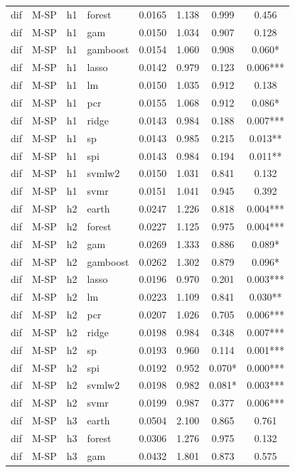 \begin{ThreePartTable}
\begin{longtable}[t]{llclcccc}
dif & M-SP & h1 & forest & 0.0165 & 1.138 & 0.999 & 0.456\\
dif & M-SP & h1 & gam & 0.0150 & 1.034 & 0.907 & 0.128\\
dif & M-SP & h1 & gamboost & 0.0154 & 1.060 & 0.908 & 0.060*\\
dif & M-SP & h1 & lasso & 0.0142 & 0.979 & 0.123 & 0.006***\\
dif & M-SP & h1 & lm & 0.0150 & 1.035 & 0.912 & 0.138\\
dif & M-SP & h1 & pcr & 0.0155 & 1.068 & 0.912 & 0.086*\\
dif & M-SP & h1 & ridge & 0.0143 & 0.984 & 0.188 & 0.007***\\
dif & M-SP & h1 & sp & 0.0143 & 0.985 & 0.215 & 0.013**\\
dif & M-SP & h1 & spi & 0.0143 & 0.984 & 0.194 & 0.011**\\
dif & M-SP & h1 & svmlw2 & 0.0150 & 1.031 & 0.841 & 0.132\\
dif & M-SP & h1 & svmr & 0.0151 & 1.041 & 0.945 & 0.392\\
\addlinespace
dif & M-SP & h2 & earth & 0.0247 & 1.226 & 0.818 & 0.004***\\
dif & M-SP & h2 & forest & 0.0227 & 1.125 & 0.975 & 0.004***\\
dif & M-SP & h2 & gam & 0.0269 & 1.333 & 0.886 & 0.089*\\
dif & M-SP & h2 & gamboost & 0.0262 & 1.302 & 0.879 & 0.096*\\
dif & M-SP & h2 & lasso & 0.0196 & 0.970 & 0.201 & 0.003***\\
dif & M-SP & h2 & lm & 0.0223 & 1.109 & 0.841 & 0.030**\\
dif & M-SP & h2 & pcr & 0.0207 & 1.026 & 0.705 & 0.006***\\
dif & M-SP & h2 & ridge & 0.0198 & 0.984 & 0.348 & 0.007***\\
dif & M-SP & h2 & sp & 0.0193 & 0.960 & 0.114 & 0.001***\\
dif & M-SP & h2 & spi & 0.0192 & 0.952 & 0.070* & 0.000***\\
dif & M-SP & h2 & svmlw2 & 0.0198 & 0.982 & 0.081* & 0.003***\\
dif & M-SP & h2 & svmr & 0.0199 & 0.987 & 0.377 & 0.006***\\
\addlinespace
dif & M-SP & h3 & earth & 0.0504 & 2.100 & 0.865 & 0.761\\
dif & M-SP & h3 & forest & 0.0306 & 1.276 & 0.975 & 0.132\\
dif & M-SP & h3 & gam & 0.0432 & 1.801 & 0.873 & 0.575\\

\end{longtable}
\end{ThreePartTable}
